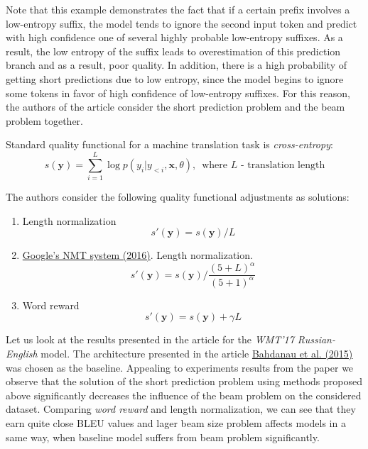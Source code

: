 \documentclass[a4paper,14pt]{extarticle}
\newcommand{\bibref}[3]{\hyperlink{#1}{#2 (#3)}}
\begin{document}
	Note that this example demonstrates the fact that if a certain prefix involves a low-entropy suffix, the model tends to ignore the second input token and predict with high confidence one of several highly probable low-entropy suffixes. As a result, the low entropy of the suffix leads to overestimation of this prediction branch and as a result, poor quality. In addition, there is a high probability of getting short predictions due to low entropy, since the model begins to ignore some tokens in favor of high confidence of low-entropy suffixes. For this reason, the authors of the article consider the short prediction problem and the beam problem together.
	
	Standard quality functional for a machine translation task is \textit{cross-entropy}:
	\begin{equation}
		s(\textbf{y}) = \sum_{i=1}^{L}\log p(y_i | y_{<i}, \textbf{x}, \theta), \,\,\, \text{where $L$ - translation length}
	\end{equation}
	
	The authors consider the following quality functional adjustments as solutions:
	\begin{enumerate}
		\item Length normalization
		\begin{equation}
			s'(\textbf{y}) = s(\textbf{y}) / L
		\end{equation}
		
		\item \bibref{gnmt}{Google's NMT system}{2016}. Length normalization. 
		\begin{equation}
			s'(\textbf{y}) = s(\textbf{y}) \Big/ \frac{(5 + L) ^ \alpha}{(5 + 1) ^ \alpha}
		\end{equation}
		
		\item Word reward
		\begin{equation}
			s'(\textbf{y}) = s(\textbf{y}) + \gamma L
		\end{equation}
	\end{enumerate}
	
	Let us look at the results presented in the article for the \textit{WMT'17 Russian-English} model. The architecture presented in the article \bibref{encdec_att}{Bahdanau et al.}{2015} was chosen as the baseline. Appealing to experiments results from the paper we observe that the solution of the short prediction problem using methods proposed above significantly decreases the influence of the beam problem on the considered dataset. Comparing \textit{word reward} and {length normalization}, we can see that they earn quite close BLEU values and lager beam size problem affects models in a same way, when baseline model suffers from beam problem significantly.
	
\end{document}

